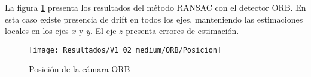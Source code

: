 La figura \ref{imagen:Resultados/V1_02_medium/ORB/Posicion} presenta los resultados del método RANSAC con el detector ORB. En esta caso existe presencia de drift en todos los ejes, manteniendo las estimaciones locales en los ejes $x$ y $y$. El eje $z$ presenta errores de estimación.

\begin{figure}[H]
	\centering
	\texttt{[image: Resultados/V1\_02\_medium/ORB/Posicion]}
	\caption{Posición de la cámara ORB}
	\label{imagen:Resultados/V1_02_medium/ORB/Posicion}
\end{figure}



